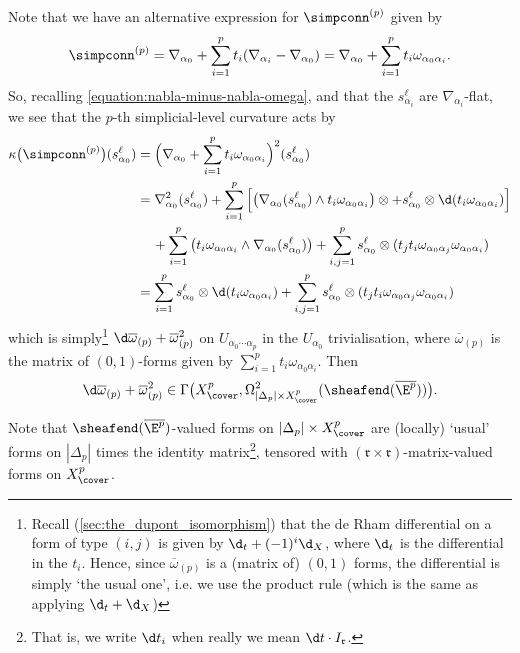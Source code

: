         Note that we have an alternative expression for $\simpconn^{(p)}$ given by
        \begin{equation}\label{equation:alternative-expression-for-simpconn}
            \simpconn^{(p)} = \nabla_{\alpha_0} + \sum_{i=1}^p t_i(\nabla_{\alpha_i}-\nabla_{\alpha_0}) = \nabla_{\alpha_0} + \sum_{i=1}^p t_i\omega_{\alpha_0\alpha_i}.
        \end{equation}
        So, recalling \cref{equation:nabla-minus-nabla-omega}, and that the $s_{\alpha_i}^\ell$ are $\nabla_{\alpha_i}$-flat, we see that the $p$-th simplicial-level curvature acts by
        \begin{align*}
            \kappa\big(\simpconn^{(p)}\big)(s_{\alpha_0}^\ell) &= \Big(\nabla_{\alpha_0} + \sum_{i=1}^p t_i\omega_{\alpha_0\alpha_i}\Big)^2(s_{\alpha_0}^\ell)\\
            &= \nabla_{\alpha_0}^2(s_{\alpha_0}^\ell) + \sum_{i=1}^p \Big[\big(\nabla_{\alpha_0}(s_{\alpha_0}^\ell)\wedge t_i\omega_{\alpha_0\alpha_i}\big)\otimes + s_{\alpha_0}^\ell\otimes\d(t_i\omega_{\alpha_0\alpha_i})\Big]\\
            &\quad\,+ \sum_{i=1}^p\big(t_i\omega_{\alpha_0\alpha_i}\wedge\nabla_{\alpha_0}(s_{\alpha_0}^\ell)\big) + \sum_{i,j=1}^p s_{\alpha_0}^\ell\otimes(t_jt_i\omega_{\alpha_0\alpha_j}\omega_{\alpha_0\alpha_i})\\
            &= \sum_{i=1}^p s_{\alpha_0}^\ell\otimes\d(t_i\omega_{\alpha_0\alpha_i}) + \sum_{i,j=1}^p s_{\alpha_0}^\ell\otimes(t_jt_i\omega_{\alpha_0\alpha_j}\omega_{\alpha_0\alpha_i})
        \end{align*}
        which is simply\footnote{Recall (\cref{sec:the_dupont_isomorphism}) that the de Rham differential on a form of type $(i,j)$ is given by $\d_{t}+(-1)^i\d_X$, where $\d_t$ is the differential in the $t_i$. Hence, since $\overline{\omega}_{(p)}$ is a (matrix of) $(0,1)$ forms, the differential is simply `the usual one', i.e. we use the product rule (which is the same as applying $\d_t+\d_X$)} $\d\overline\omega_{(p)}+\overline{\omega}^2_{(p)}$ on $U_{\alpha_0\cdots\alpha_p}$ in the $U_{\alpha_0}$ trivialisation, where $\overline{\omega}_{(p)}$ is the matrix of $(0,1)$-forms given by $\sum_{i=1}^p t_i\omega_{\alpha_0\alpha_i}$.
        Then
        \[
            \d\overline{\omega}_{(p)} + \overline{\omega}_{(p)}^2 \in \Gamma\big(X^p_\cover,\Omega^2_{|\Delta_p|\times X^p_\cover}(\sheafend({\overline{\E^p}}))\big).
        \]

        \begin{note}
            Note that $\sheafend(\overline{\E^p})$-valued forms on $|\Delta_p|\times X^p_\cover$ are (locally) `usual' forms on $|\Delta_p|$ times the identity matrix\footnote{That is, we write $\d t_i$ when really we mean $\d t\cdot I_\mathfrak{r}$.}, tensored with $(\mathfrak{r}\times \mathfrak{r})$-matrix-valued forms on $X^p_\cover$.
        \end{note}

